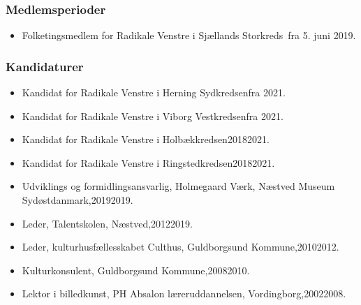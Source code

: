 \documentclass[11pt, a4paper]{awesome-cv}
\begin{document}
\begin{cvletter}
\subsubsection*{Medlemsperioder}
\begin{itemize}
\item Folketingsmedlem for Radikale Venstre i Sjællands Storkreds fra 5. juni 2019.
\end{itemize}
\subsubsection*{Kandidaturer}
\begin{itemize}
\item Kandidat for Radikale Venstre i Herning Sydkredsenfra 2021.
\item Kandidat for Radikale Venstre i Viborg Vestkredsenfra 2021.
\item Kandidat for Radikale Venstre i Holbækkredsen20182021.
\item Kandidat for Radikale Venstre i Ringstedkredsen20182021.
\end{itemize}
\begin{itemize}
\item Udviklings og formidlingsansvarlig, Holmegaard Værk, Næstved Museum Sydøstdanmark,20192019.
\item Leder, Talentskolen, Næstved,20122019.
\item Leder, kulturhusfællesskabet Culthus, Guldborgsund Kommune,20102012.
\item Kulturkonsulent, Guldborgsund Kommune,20082010.
\item Lektor i billedkunst, PH Absalon læreruddannelsen, Vordingborg,20022008.
\end{itemize}
\end{cvletter}
\end{document}
